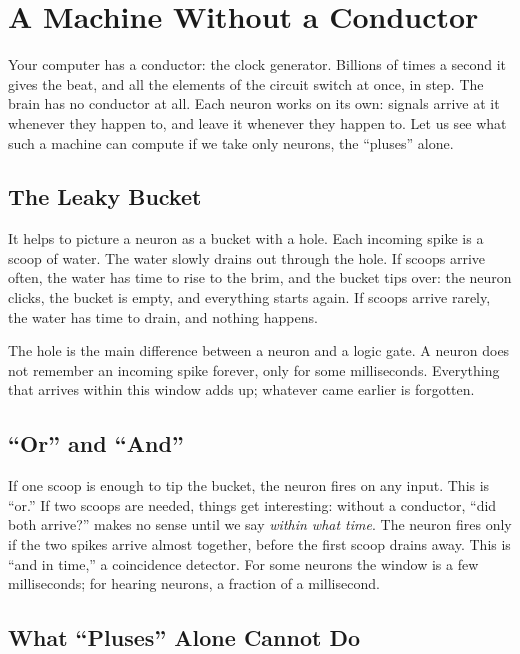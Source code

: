 \chapter{A Machine Without a Conductor}

Your computer has a conductor: the clock generator. Billions of times a second it gives the beat, and all the elements of the circuit switch at once, in step. The brain has no conductor at all. Each neuron works on its own: signals arrive at it whenever they happen to, and leave it whenever they happen to. Let us see what such a machine can compute if we take only  neurons, the ``pluses'' alone.

\section*{The Leaky Bucket}

It helps to picture a neuron as a bucket with a hole. Each incoming spike is a scoop of water. The water slowly drains out through the hole. If scoops arrive often, the water has time to rise to the brim, and the bucket tips over: the neuron clicks, the bucket is empty, and everything starts again. If scoops arrive rarely, the water has time to drain, and nothing happens.


The hole is the main difference between a neuron and a logic gate. A neuron does not remember an incoming spike forever, only for some milliseconds. Everything that arrives within this window adds up; whatever came earlier is forgotten.

\section*{``Or'' and ``And''}

If one scoop is enough to tip the bucket, the neuron fires on any input. This is ``or.'' If two scoops are needed, things get interesting: without a conductor, ``did both arrive?'' makes no sense until we say \emph{within what time}. The neuron fires only if the two spikes arrive almost together, before the first scoop drains away. This is ``and in time,'' a coincidence detector. For some neurons the window is a few milliseconds; for hearing neurons, a fraction of a millisecond.

\section*{What ``Pluses'' Alone Cannot Do}

